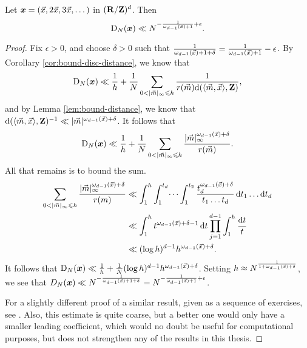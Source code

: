 \begin{theorem}\label{thm:disc-upper-bound}
Let ${\boldsymbol x}=(\vec{x},2\vec{x},3\vec{x},\dots)$ in $(\mathbf{R}/\mathbf{Z})^d$. Then 
\[
	\operatorname{D}_N({\boldsymbol x}) \ll N^{-\frac{1}{\omega_{d-1}(\vec{x})+1}+\epsilon} .
\]
\end{theorem}
\begin{proof}
Fix $\epsilon>0$, and choose $\delta>0$ such that 
$\frac{1}{\omega_{d-1}(\vec{x})+1+\delta} = \frac{1}{\omega_{d-1}(\vec{x})+1} - \epsilon$. 
By Corollary \ref{cor:bound-disc-distance}, we know that 
\[
	\D_N(\bx) \ll \frac 1 h + \frac 1 N \sum_{0<|\vm|_\infty \leqslant h} \frac{1}{r(\vm) \dd(\langle \vm,\vx\rangle,\bZ)} ,
\]
and by Lemma \ref{lem:bound-distance}, we know that 
$\mathrm{d}(\langle \vec{m},\vec{x}\rangle,\mathbf{Z})^{-1} \ll |\vec{m}|^{\omega_{d-1}(\vec{x})+\delta}$. 
It follows that 
\[
	\operatorname{D}_N({\boldsymbol x}) \ll \frac 1 h + \frac 1 N \sum_{0 < |\vec{m}|_\infty \leqslant h} \frac{|\vec{m}|_\infty^{\omega_{d-1}(\vec{x})+\delta}}{r(\vec{m})} .
\]
All that remains is to bound the sum. 
\begin{align*}
	\sum_{0< |\vec{m}|_\infty \leqslant h} \frac{|\vec{m}|_\infty^{\omega_{d-1}(\vec{x})+\delta}}{r(m)} 
		&\ll \int_1^h \int_1^{t_d} \dots \int_1^{t_2} \frac{t_d^{\omega_{d-1}(\vec{x})+\delta}}{t_1 \dots t_d}\, \mathrm{d} t_1 \dots \mathrm{d} t_d \\
		&\ll \int_1^h t^{\omega_{d-1}(\vec{x})+\delta-1}\, \mathrm{d} t \prod_{j=1}^{d-1} \int_1^h \frac{\mathrm{d} t}{t} \\
		&\ll (\log h)^{d-1} h^{\omega_{d-1}(\vec{x})+\delta} .
\end{align*}
It follows that 
$\operatorname{D}_N({\boldsymbol x}) \ll \frac 1 h + \frac 1 N (\log h)^{d-1} h^{\omega_{d-1}(\vec{x})+\delta}$. 
Setting $h\approx N^{\frac{1}{1+\omega_{d-1}(\vec{x})+\delta}}$, we see that 
$D_N({\boldsymbol x}) \ll N^{-\frac{1}{\omega_{d-1}(\vec{x})+1+\delta}} = N^{-\frac{1}{\omega_{d-1}(\vec{x})+1} + \epsilon}$. 

For a slightly different proof of a similar result, given as a sequence of 
exercises, see  \cite[Ch.~2, Ex.~3.15, 16, 17]{kuipers-niederreiter-1974}. 
Also, this estimate is quite coarse, but a better one would only have a smaller 
leading coefficient, which would no doubt be useful for computational 
purposes, but does not strengthen any of the results in this thesis.  
\end{proof}

